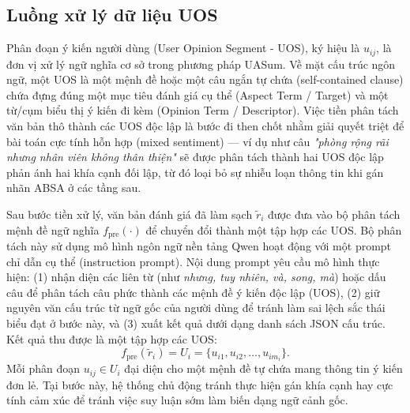 \subsection{Luồng xử lý dữ liệu UOS}
\label{subsec:method1-uos-workflow}

Phân đoạn ý kiến người dùng (User Opinion Segment - UOS), ký hiệu là $u_{ij}$, là đơn vị xử lý ngữ nghĩa cơ sở trong phương pháp UASum. Về mặt cấu trúc ngôn ngữ, một UOS là một mệnh đề hoặc một câu ngắn tự chứa (self-contained clause) chứa đựng đúng một mục tiêu đánh giá cụ thể (Aspect Term / Target) và một từ/cụm biểu thị ý kiến đi kèm (Opinion Term / Descriptor). Việc tiền phân tách văn bản thô thành các UOS độc lập là bước đi then chốt nhằm giải quyết triệt để bài toán cực tính hỗn hợp (mixed sentiment) — ví dụ như câu \textit{"phòng rộng rãi nhưng nhân viên không thân thiện"} sẽ được phân tách thành hai UOS độc lập phản ánh hai khía cạnh đối lập, từ đó loại bỏ sự nhiễu loạn thông tin khi gán nhãn ABSA ở các tầng sau.

Sau bước tiền xử lý, văn bản đánh giá đã làm sạch $\tilde{r}_i$ được đưa vào bộ phân tách mệnh đề ngữ nghĩa $f_{\mathrm{pre}}(\cdot)$ để chuyển đổi thành một tập hợp các UOS. Bộ phân tách này sử dụng mô hình ngôn ngữ nền tảng Qwen hoạt động với một prompt chỉ dẫn cụ thể (instruction prompt). Nội dung prompt yêu cầu mô hình thực hiện: (1) nhận diện các liên từ (như \textit{nhưng, tuy nhiên, và, song, mà}) hoặc dấu câu để phân tách câu phức thành các mệnh đề ý kiến độc lập (UOS), (2) giữ nguyên văn cấu trúc từ ngữ gốc của người dùng để tránh làm sai lệch sắc thái biểu đạt ở bước này, và (3) xuất kết quả dưới dạng danh sách JSON cấu trúc. Kết quả thu được là một tập hợp các UOS:
\begin{equation}
f_{\mathrm{pre}}(\tilde{r}_i) = U_i = \{u_{i1}, u_{i2}, \dots, u_{im_i}\}.
\label{eq:method1-presegmentation}
\end{equation}
Mỗi phân đoạn $u_{ij} \in U_i$ đại diện cho một mệnh đề tự chứa mang thông tin ý kiến đơn lẻ. Tại bước này, hệ thống chủ động tránh thực hiện gán khía cạnh hay cực tính cảm xúc để tránh việc suy luận sớm làm biến dạng ngữ cảnh gốc.

